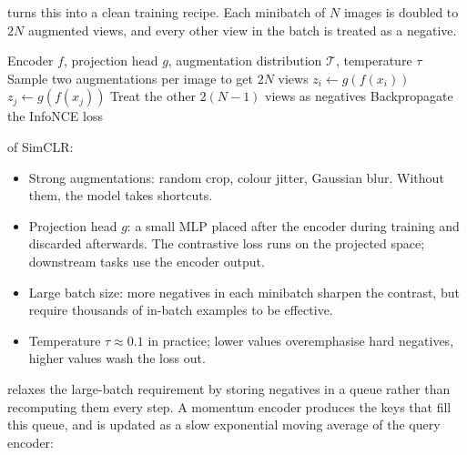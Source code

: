 \vspace{1.5em}
\cite{Chen2020SimCLR} turns this into a clean training recipe. Each minibatch of $N$ images is doubled to $2N$ augmented views, and every other view in the batch is treated as a negative.


\begin{algorithm}[H]
\caption{SimCLR}
\begin{algorithmic}[1]
\Require Encoder $f$, projection head $g$, augmentation distribution $\mathcal{T}$, temperature $\tau$
    \State Sample two augmentations per image to get $2N$ views
        \State $z_i \gets g(f(x_i))$
        \State $z_j \gets g(f(x_j))$
        \State Treat the other $2(N-1)$ views as negatives
        \State Backpropagate the InfoNCE loss
    \EndFor
\EndFor
\end{algorithmic}
\end{algorithm}

 of SimCLR:
\begin{itemize}
    \item Strong augmentations: random crop, colour jitter, Gaussian blur. Without them, the model takes shortcuts.
    \item Projection head $g$: a small MLP placed after the encoder during training and discarded afterwards. The contrastive loss runs on the projected space; downstream tasks use the encoder output.
    \item Large batch size: more negatives in each minibatch sharpen the contrast, but require thousands of in-batch examples to be effective.
    \item Temperature $\tau \approx 0.1$ in practice; lower values overemphasise hard negatives, higher values wash the loss out.
\end{itemize}

\vspace{1.5em}
\cite{He2020MoCo} relaxes the large-batch requirement by storing negatives in a queue rather than recomputing them every step. A momentum encoder produces the keys that fill this queue, and is updated as a slow exponential moving average of the query encoder:


